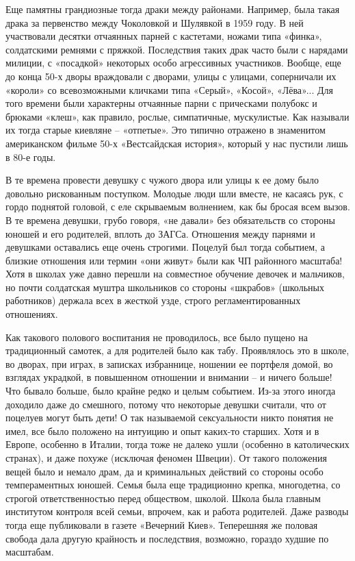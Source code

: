 Еще памятны грандиозные тогда драки между районами. Например, была такая драка
за первенство между Чоколовкой и Шулявкой в 1959 году. В ней участвовали
десятки отчаянных парней с кастетами, ножами типа «финка», солдатскими ремнями
с пряжкой. Последствия таких драк часто были с нарядами милиции, с «посадкой»
некоторых особо агрессивных участников. Вообще, еще до конца 50-х дворы
враждовали с дворами, улицы с улицами, соперничали их «короли» со всевозможными
кличками типа «Серый», «Косой», «Лёва»... Для того времени были характерны
отчаянные парни с прическами полубокс и брюками «клеш», как правило, рослые,
симпатичные, мускулистые. Как называли их тогда старые киевляне – «отпетые».
Это типично отражено в знаменитом американском фильме 50-х «Вестсайдская
история», который у нас пустили лишь в 80-е годы. 

В те времена провести девушку с чужого двора или улицы к ее дому было довольно
рискованным поступком. Молодые люди шли вместе, не касаясь рук, с гордо
поднятой головой, с еле скрываемым волнением, как бы бросая всем вызов. В те
времена девушки, грубо говоря, «не давали» без обязательств со стороны юношей и
его родителей, вплоть до ЗАГСа. Отношения между парнями и девушками оставались
еще очень строгими. Поцелуй был тогда событием, а близкие отношения или термин
«они живут» были как ЧП районного масштаба! Хотя в школах уже давно перешли на
совместное обучение девочек и мальчиков, но почти солдатская муштра школьников
со стороны «шкрабов» (школьных работников) держала всех в жесткой узде, строго
регламентированных отношениях. 

Как такового полового воспитания не проводилось, все было пущено на
традиционный самотек, а для родителей было как табу. Проявлялось это в школе,
во дворах, при играх, в записках избраннице, ношении ее портфеля домой, во
взглядах украдкой, в повышенном отношении и внимании – и ничего больше! Что
бывало больше, было крайне редко и целым событием. Из-за этого иногда доходило
даже до смешного, потому что некоторые девушки считали, что от поцелуев могут
быть дети! О так называемой сексуальности никто понятия не имел, все было
положено на интуицию и опыт каких-то старших. Хотя и в Европе, особенно в
Италии, тогда тоже не далеко ушли (особенно в католических странах), и даже
похуже (исключая феномен Швеции). От такого положения вещей было и немало драм,
да и криминальных действий со стороны особо темпераментных юношей. Семья была
еще традиционно крепка, многодетна, со строгой ответственностью перед
обществом, школой. Школа была главным институтом контроля всей семьи, впрочем,
как и работа родителей. Даже разводы тогда еще публиковали в газете «Вечерний
Киев». Теперешняя же половая свобода дала другую крайность и последствия,
возможно, гораздо худшие по масштабам. 

